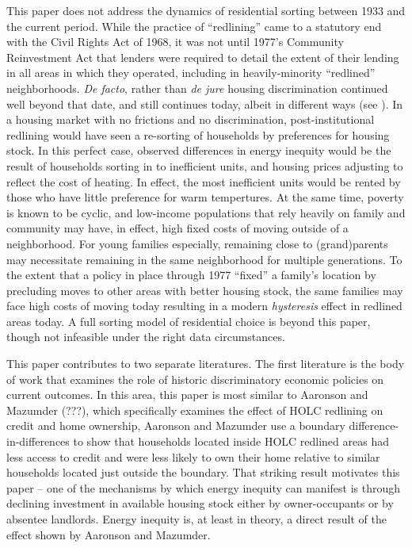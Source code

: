 \documentclass[
]{article}
\begin{document}
This paper does not address the dynamics of residential sorting between 1933 and the current period. While the practice of ``redlining'' came to a statutory end
with the Civil Rights Act of 1968, it was not until 1977's Community Reinvestment Act that lenders were required to detail the extent of their lending
in all areas in which they operated, including in heavily-minority ``redlined'' neighborhoods. \emph{De facto}, rather than \emph{de jure} housing discrimination continued
well beyond that date, and still continues today, albeit in different ways (see \citet{Christensen2020}). In a housing
market with no frictions and no discrimination, post-institutional redlining would have seen a re-sorting of households by preferences for housing stock. In
this perfect case, observed differences in energy inequity would be the result of households sorting in to inefficient units, and housing prices adjusting to
reflect the cost of heating. In effect, the most inefficient units would be rented by those who have little preference for warm tempertures. At the same time,
poverty is known to be cyclic, and low-income populations that rely heavily on family and community may have, in effect, high fixed costs of moving outside of a neighborhood. For young families especially, remaining close to (grand)parents may necessitate remaining in the same neighborhood for multiple generations. To the extent that a policy in place through 1977 ``fixed'' a family's location by precluding moves to other areas with better housing stock, the same families may face high costs of moving today resulting in a modern \emph{hysteresis} effect in redlined areas today. A full sorting model of residential choice is beyond this paper, though not infeasible under the right data circumstances.

This paper contributes to two separate literatures. The first literature
is the body of work that examines the role of historic discriminatory economic policies on
current outcomes. In this area, this paper is most similar to Aaronson and Mazumder (???), which specifically examines the effect of HOLC redlining on credit and home ownership, Aaronson and Mazumder use a boundary difference-in-differences to show that households located inside HOLC redlined areas had less access to credit and were less likely to own their home relative to similar households located just outside the boundary. That striking result motivates this paper -- one of the mechanisms by which energy inequity can manifest is through declining investment in available housing stock either by owner-occupants or by absentee landlords. Energy inequity is, at least in theory, a direct result of the effect shown by Aaronson and Mazumder.
\end{document}
